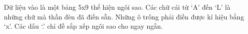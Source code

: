 Dữ liệu vào là một bảng 5x9 thể hiện ngôi sao. Các chữ cái từ ‘A’ đến ‘L’ là những chữ mà thần đèn đã điền sẵn. Những ô trống phải điền được kí hiệu bằng ‘x’. Các dấu ‘.’ chỉ đề sắp xếp ngôi sao cho ngay ngắn.  

\